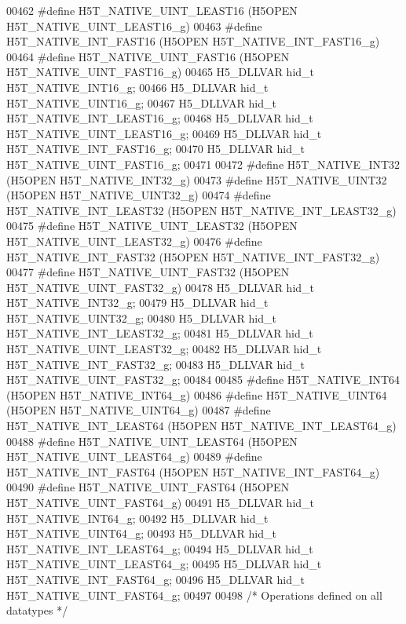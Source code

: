 \begin{DoxyCode}
00462 \textcolor{preprocessor}{#define H5T\_NATIVE\_UINT\_LEAST16     (H5OPEN H5T\_NATIVE\_UINT\_LEAST16\_g)}
00463 \textcolor{preprocessor}{#define H5T\_NATIVE\_INT\_FAST16       (H5OPEN H5T\_NATIVE\_INT\_FAST16\_g)}
00464 \textcolor{preprocessor}{#define H5T\_NATIVE\_UINT\_FAST16      (H5OPEN H5T\_NATIVE\_UINT\_FAST16\_g)}
00465 H5\_DLLVAR hid\_t H5T\_NATIVE\_INT16\_g;
00466 H5\_DLLVAR hid\_t H5T\_NATIVE\_UINT16\_g;
00467 H5\_DLLVAR hid\_t H5T\_NATIVE\_INT\_LEAST16\_g;
00468 H5\_DLLVAR hid\_t H5T\_NATIVE\_UINT\_LEAST16\_g;
00469 H5\_DLLVAR hid\_t H5T\_NATIVE\_INT\_FAST16\_g;
00470 H5\_DLLVAR hid\_t H5T\_NATIVE\_UINT\_FAST16\_g;
00471 
00472 \textcolor{preprocessor}{#define H5T\_NATIVE\_INT32        (H5OPEN H5T\_NATIVE\_INT32\_g)}
00473 \textcolor{preprocessor}{#define H5T\_NATIVE\_UINT32       (H5OPEN H5T\_NATIVE\_UINT32\_g)}
00474 \textcolor{preprocessor}{#define H5T\_NATIVE\_INT\_LEAST32      (H5OPEN H5T\_NATIVE\_INT\_LEAST32\_g)}
00475 \textcolor{preprocessor}{#define H5T\_NATIVE\_UINT\_LEAST32     (H5OPEN H5T\_NATIVE\_UINT\_LEAST32\_g)}
00476 \textcolor{preprocessor}{#define H5T\_NATIVE\_INT\_FAST32       (H5OPEN H5T\_NATIVE\_INT\_FAST32\_g)}
00477 \textcolor{preprocessor}{#define H5T\_NATIVE\_UINT\_FAST32      (H5OPEN H5T\_NATIVE\_UINT\_FAST32\_g)}
00478 H5\_DLLVAR hid\_t H5T\_NATIVE\_INT32\_g;
00479 H5\_DLLVAR hid\_t H5T\_NATIVE\_UINT32\_g;
00480 H5\_DLLVAR hid\_t H5T\_NATIVE\_INT\_LEAST32\_g;
00481 H5\_DLLVAR hid\_t H5T\_NATIVE\_UINT\_LEAST32\_g;
00482 H5\_DLLVAR hid\_t H5T\_NATIVE\_INT\_FAST32\_g;
00483 H5\_DLLVAR hid\_t H5T\_NATIVE\_UINT\_FAST32\_g;
00484 
00485 \textcolor{preprocessor}{#define H5T\_NATIVE\_INT64        (H5OPEN H5T\_NATIVE\_INT64\_g)}
00486 \textcolor{preprocessor}{#define H5T\_NATIVE\_UINT64       (H5OPEN H5T\_NATIVE\_UINT64\_g)}
00487 \textcolor{preprocessor}{#define H5T\_NATIVE\_INT\_LEAST64      (H5OPEN H5T\_NATIVE\_INT\_LEAST64\_g)}
00488 \textcolor{preprocessor}{#define H5T\_NATIVE\_UINT\_LEAST64     (H5OPEN H5T\_NATIVE\_UINT\_LEAST64\_g)}
00489 \textcolor{preprocessor}{#define H5T\_NATIVE\_INT\_FAST64       (H5OPEN H5T\_NATIVE\_INT\_FAST64\_g)}
00490 \textcolor{preprocessor}{#define H5T\_NATIVE\_UINT\_FAST64      (H5OPEN H5T\_NATIVE\_UINT\_FAST64\_g)}
00491 H5\_DLLVAR hid\_t H5T\_NATIVE\_INT64\_g;
00492 H5\_DLLVAR hid\_t H5T\_NATIVE\_UINT64\_g;
00493 H5\_DLLVAR hid\_t H5T\_NATIVE\_INT\_LEAST64\_g;
00494 H5\_DLLVAR hid\_t H5T\_NATIVE\_UINT\_LEAST64\_g;
00495 H5\_DLLVAR hid\_t H5T\_NATIVE\_INT\_FAST64\_g;
00496 H5\_DLLVAR hid\_t H5T\_NATIVE\_UINT\_FAST64\_g;
00497 
00498 \textcolor{comment}{/* Operations defined on all datatypes */}

\end{DoxyCode}
